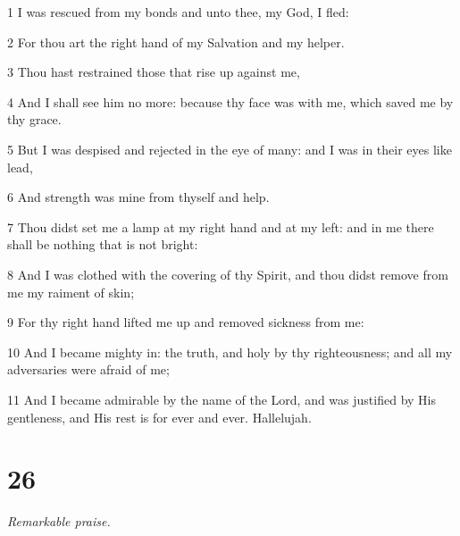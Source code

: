\par 1 I was rescued from my bonds and unto thee, my God, I fled:
\par 2 For thou art the right hand of my Salvation and my helper.
\par 3 Thou hast restrained those that rise up against me,
\par 4 And I shall see him no more: because thy face was with me, which saved me by thy grace.
\par 5 But I was despised and rejected in the eye of many: and I was in their eyes like lead,
\par 6 And strength was mine from thyself and help.
\par 7 Thou didst set me a lamp at my right hand and at my left: and in me there shall be nothing that is not bright:
\par 8 And I was clothed with the covering of thy Spirit, and thou didst remove from me my raiment of skin;
\par 9 For thy right hand lifted me up and removed sickness from me:
\par 10 And I became mighty in: the truth, and holy by thy righteousness; and all my adversaries were afraid of me;
\par 11 And I became admirable by the name of the Lord, and was justified by His gentleness, and His rest is for ever and ever. Hallelujah.

\chapter{26}

\par \textit{Remarkable praise.}

